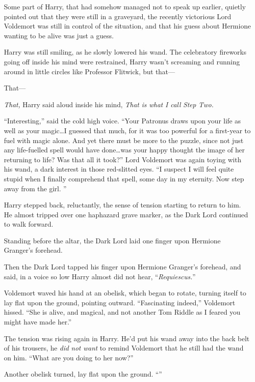 Some part of Harry, that had somehow managed not to speak up earlier, quietly pointed out that they were still in a graveyard, the recently victorious Lord Voldemort was still in control of the situation, and that his guess about Hermione wanting to be alive was just a guess.

Harry was still smiling, as he slowly lowered his wand. The celebratory fireworks going off inside his mind were restrained, Harry wasn’t screaming and running around in little circles like Professor Flitwick, but that—

That—

\emph{\emph{That,}} Harry said aloud inside his mind, \emph{\emph{That} is what I call Step Two.}

“Interesting,” said the cold high voice. “Your Patronus draws upon your life as well as your magic…I guessed that much, for it was too powerful for a first-year to fuel with magic alone. And yet there must be more to the puzzle, since not just any life-fuelled spell would have done…was your happy thought the image of her returning to life? Was that all it took?” Lord Voldemort was again toying with his wand, a dark interest in those red-slitted eyes. “I suspect I will feel quite stupid when I finally comprehend that spell, some day in my eternity. Now step away from the girl. ”

Harry stepped back, reluctantly, the sense of tension starting to return to him. He almost tripped over one haphazard grave marker, as the Dark Lord continued to walk forward.

Standing before the altar, the Dark Lord laid one finger upon Hermione Granger’s forehead.

Then the Dark Lord tapped his finger upon Hermione Granger’s forehead, and said, in a voice so low Harry almost did not hear, “\emph{Requiescus.}”

Voldemort waved his hand at an obelisk, which began to rotate, turning itself to lay flat upon the ground, pointing outward. “Fascinating indeed,” Voldemort hissed. “She is alive, and magical, and not another Tom Riddle as I feared you might have made her.”

The tension was rising again in Harry. He’d put his wand away into the back belt of his trousers, he \emph{did not want} to remind Voldemort that he still had the wand on him. “What are you doing to her now?”

Another obelisk turned, lay flat upon the ground. “”

